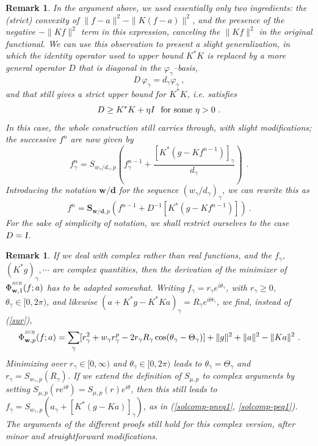 \documentclass[10pt]{article}
\newtheorem{remark}[theorem]{Remark}
\def\S{\mathbf{S}}
\def\I{\sl {I}}
\def\K{K^*}
\def\SUR{\mbox{\tiny{\it{SUR}}}}
\def\fg{f_{\gamma}}
\def\ag{w_{\gamma}}
\def\vpg{\varphi_{\gamma}}
\newcommand\eref[1]{(\ref{#1})}
\begin{document}
\begin{remark}
\label{op-D}
{\rm In the argument above, we used essentially only two ingredients: the
(strict)
convexity of $\|f-a\|^2-\|K(f-a)\|^2$, and the presence of the negative
$-\|Kf\|^2$
term in this expression, canceling the $\|Kf\|^2$ in the original
functional. We can use this observation to present a slight
generalization, in which the identity operator used to upper bound $ \K K
$ is replaced by a more general operator $D$ that is diagonal in the
$\vpg$--basis,}
$$
D\, \vpg = d_{\gamma} \vpg~,
$$
{\rm and that still gives a strict upper bound for $ \K K$, i.e. satisfies}
$$
D \geq K^*K + \eta I\ \  \mbox{\rm for some } \eta >0\ .
$$
{\rm In this case, the whole construction still carries through, with slight
modifications; the successive $f^n$ are now given by }
\begin{equation*}
\fg ^n = S_{\ag/d_{\gamma},p}\left(\fg ^{n-1} +
\frac {[\K (g-Kf^{n-1})]_{\gamma}}{d_{\gamma}} \right) ~~.
\end{equation*}
{\rm Introducing the notation $\mathbf{w/d}$ for the sequence
$(\ag/d_{\gamma})_{\gamma}$, we can rewrite this as }
\begin{equation*}
f^n = \S_{\mathbf{w/d},p}\left( f^{n-1} +D^{-1}[\K (g-Kf^{n-1})] \right) ~.
\end{equation*}
{\rm
For the sake of simplicity of notation,
we shall restrict ourselves
to the case $D = \mbox{\I}$.}
\end{remark}

\begin{remark}
\label{2-5}
{\rm If we deal with complex rather than real functions, and the $f_{\gamma}$,
$(K^*g)_{\gamma}, \cdots$ are complex quantities, then the derivation
of the minimizer of ${\Phi}^{^{\SUR}}_{\mathbf{w},1}(f; a)$
has to be adapted somewhat. Writing
$f_{\gamma}= r_{\gamma} e^{i \theta_{\gamma}}$, with
$ r_{\gamma} \geq 0$, $\theta_{\gamma} \in [0,2 \pi )$,
and likewise $(a +K^*g -K^*Ka)_{\gamma} = R_{\gamma} e^{i \Theta_{\gamma}}$,
we find, instead of \eref{sur},
$$
{\Phi}^{^{\SUR}}_{\mathbf{w},p}(f; a)
= \sum_{\gamma} [ r_{\gamma}^2+ w_{\gamma}r_{\gamma}^p
- 2r_{\gamma}R_{\gamma}\cos(\theta_{\gamma}-\Theta_{\gamma})]
+\|g\|^2+\|a\|^2-\|Ka\|^2~.
$$
Minimizing over $r_{\gamma} \in [0,\infty)$ and
$\theta_{\gamma} \in [0,2 \pi)$ leads to
$\theta_{\gamma}=\Theta_{\gamma}$ and
$r_{\gamma}=S_{w_{\gamma},p}(R_{\gamma})$.
If we extend the definition
of $S_{\mu,p}$ to complex arguments by setting
$S_{\mu,p}(r e^{i \theta}) = S_{\mu,p}(r) e^{i \theta}$,
then this still leads to
$\fg= S_{w_{\gamma},p}\left(a_{\gamma} +[K^*(g -Ka)]_{\gamma} \right)$,
as in (\ref{solcomp-pneq1}, \ref{solcomp-peq1}).
The arguments of the different proofs still
hold for this complex version, after minor and straightforward modifications.}
\end{remark}
\end{document}

